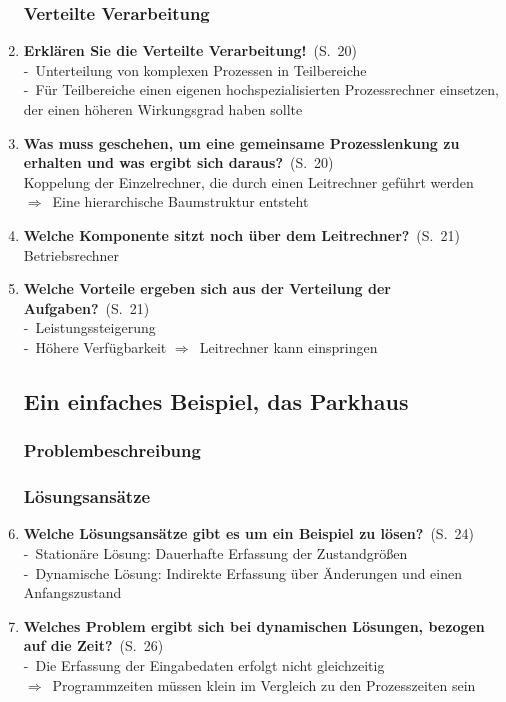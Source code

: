 \documentclass[a4paper,12pt]{article}
\newcommand{\question}[3]{\pagebreak[3]\item {\textbf{#1?}}\ (S.\ #2)#3}
\newcommand{\statement}[3]{\pagebreak[3]\item {\textbf{#1!}}\ (S.\ #2)#3}
\newcommand{\catchword}[1]{\\-\ #1}
\newcommand{\normaltext}[1]{\\#1}
\newcommand{\result}[1]{\\$\Rightarrow$\ #1}
\newcommand{\resultol}[1]{$\Rightarrow$\ #1}
\newcommand{\page}[1]{#1}
\begin{document}
\begin{enumerate}
  \subsubsection{Verteilte Verarbeitung}

  \statement{Erklären Sie die Verteilte Verarbeitung}{\page{20}}
  {
    \catchword{Unterteilung von komplexen Prozessen in Teilbereiche}
    \catchword{Für Teilbereiche einen eigenen hochspezialisierten Prozessrechner einsetzen,
               der einen höheren Wirkungsgrad haben sollte}
  }

  \question{Was muss geschehen, um eine gemeinsame Prozesslenkung zu erhalten und
            was ergibt sich daraus}{\page{20}}
  {
    \normaltext{Koppelung der Einzelrechner, die durch einen Leitrechner geführt werden}
    \result{Eine hierarchische Baumstruktur entsteht}
  }

  \question{Welche Komponente sitzt noch über dem Leitrechner}{\page{21}}
  {
    \normaltext{Betriebsrechner}
  }

  \question{Welche Vorteile ergeben sich aus der Verteilung der Aufgaben}{\page{21}}
  {
    \catchword{Leistungssteigerung}
    \catchword{Höhere Verfügbarkeit \resultol{Leitrechner kann einspringen}}
  }

  \subsection{Ein einfaches Beispiel, das Parkhaus}

  \subsubsection{Problembeschreibung}

  \subsubsection{Lösungsansätze}

  \question{Welche Lösungsansätze gibt es um ein Beispiel zu lösen}{\page{24}}
  {
    \catchword{Stationäre Lösung: Dauerhafte Erfassung der Zustandgrößen}
    \catchword{Dynamische Lösung: Indirekte Erfassung über Änderungen und einen Anfangszustand}
  }

  \question{Welches Problem ergibt sich bei dynamischen Lösungen, bezogen auf die Zeit}{\page{26}}
  {
    \catchword{Die Erfassung der Eingabedaten erfolgt nicht gleichzeitig}
    \result{Programmzeiten müssen klein im Vergleich zu den Prozesszeiten sein}
  }


\end{enumerate}
\end{document}
